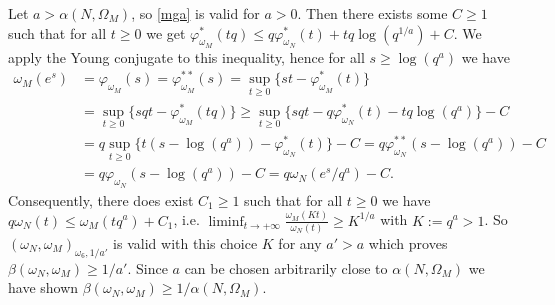 \documentclass[10pt]{amsart}%
\numberwithin{equation}{section}
\theoremstyle{plain}
\begin{document}
Let  $a>\alpha(N,\Omega_M)$, so \eqref{mga} is valid for $a>0$. Then there exists some $C\ge 1$ such that for all $t\ge 0$ we get $\varphi^{*}_{\omega_{M}}(tq)\le q\varphi^{*}_{\omega_{N}}(t)+tq\log(q^{1/a})+C$. We apply the Young conjugate to this inequality, hence for all $s\ge\log(q^{a})$ we have
\begin{align*}
\omega_{M}(e^s)&=\varphi_{\omega_{M}}(s)=\varphi^{**}_{\omega_{M}}(s)=\sup_{t\ge 0}\{st-\varphi^{*}_{\omega_{M}}(t)\}
\\&
=\sup_{t\ge 0}\{sqt-\varphi^{*}_{\omega_{M}}(tq)\}\ge\sup_{t\ge 0}\{sqt-q\varphi^{*}_{\omega_{N}}(t)-tq\log(q^{a})\}-C
\\&
=q\sup_{t\ge 0}\{t(s-\log(q^{a}))-\varphi^{*}_{\omega_{N}}(t)\}-C=q\varphi^{**}_{\omega_{N}}(s-\log(q^{a}))-C
\\&
=q\varphi_{\omega_{N}}(s-\log(q^{a}))-C=q\omega_{N}(e^s/q^{a})-C.
\end{align*}
Consequently, there does exist $C_1\ge 1$ such that for all $t\ge 0$ we have $q\omega_{N}(t)\le\omega_{M}(tq^{a})+C_1$, i.e. $\liminf_{t\rightarrow+\infty}\frac{\omega_{M}(Kt)}{\omega_{N}(t)}\ge K^{1/a}$ with $K:=q^{a}>1$. So $(\omega_{N},\omega_{M})_{\omega_6,1/a'}$ is valid with this choice $K$ for any $a'>a$ which proves $\beta(\omega_{N},\omega_{M})\ge 1/a'$. Since $a$ can be chosen arbitrarily close to $\alpha(N,\Omega_M)$  we have shown $\beta(\omega_{N},\omega_{M})\ge 1/\alpha(N,\Omega_M)$.\vspace{6pt}
\end{document}
